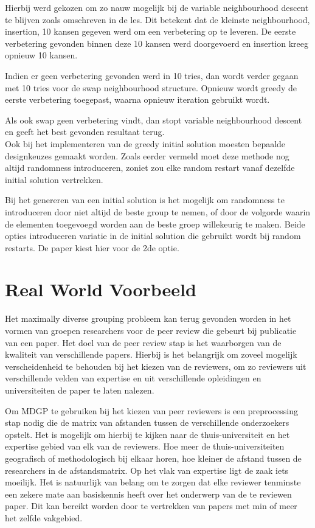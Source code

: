 \documentclass[pdftex,12pt,a4paper]{article}
\begin{document}
Hierbij werd gekozen om zo nauw mogelijk bij de variable neighbourhood descent te blijven zoals omschreven in de les. Dit betekent dat de kleinste neighbourhood, insertion, 10 kansen gegeven werd om een verbetering op te leveren.
De eerste verbetering gevonden binnen deze 10 kansen werd doorgevoerd en insertion kreeg opnieuw 10 kansen.

Indien er geen verbetering gevonden werd in 10 tries, dan wordt verder gegaan met 10 tries voor de swap neighbourhood structure. Opnieuw wordt greedy de eerste verbetering toegepast, waarna opnieuw iteration gebruikt wordt.

Als ook swap geen verbetering vindt, dan stopt variable neighbourhood descent en geeft het best gevonden resultaat terug.
\\[1em]
Ook bij het implementeren van de greedy initial solution moesten bepaalde designkeuzes gemaakt worden. Zoals eerder vermeld moet deze methode nog altijd randomness introduceren, zoniet zou elke random restart vanaf dezelfde initial solution vertrekken.

Bij het genereren van een initial solution is het mogelijk om randomness te introduceren door niet altijd de beste group te nemen, of door de volgorde waarin de elementen toegevoegd worden aan de beste groep willekeurig te maken. Beide opties introduceren variatie in de initial solution die gebruikt wordt bij random restarts. De paper kiest hier voor de 2de optie.

\section{Real World Voorbeeld}

Het maximally diverse grouping probleem kan terug gevonden worden in het vormen van groepen researchers voor de peer review die gebeurt bij publicatie van een paper. Het doel van de peer review stap is het waarborgen van de kwaliteit van verschillende papers. Hierbij is het belangrijk om zoveel mogelijk verscheidenheid te behouden bij het kiezen van de reviewers, om zo reviewers uit verschillende velden van expertise en uit verschillende opleidingen en universiteiten de paper te laten nalezen.

Om MDGP te gebruiken bij het kiezen van peer reviewers is een preprocessing stap nodig die de matrix van afstanden tussen de verschillende onderzoekers opstelt. Het is mogelijk om hierbij te kijken naar de thuis-universiteit en het expertise gebied van elk van de reviewers. Hoe meer de thuis-universiteiten geografisch of methodologisch bij elkaar horen, hoe kleiner de afstand tussen de researchers in de afstandsmatrix. Op het vlak van expertise ligt de zaak iets moeilijk. Het is natuurlijk van belang om te zorgen dat elke reviewer tenminste een zekere mate aan basiskennis heeft over het onderwerp van de te reviewen paper. Dit kan bereikt worden door te vertrekken van papers met min of meer het zelfde vakgebied.
\end{document}
